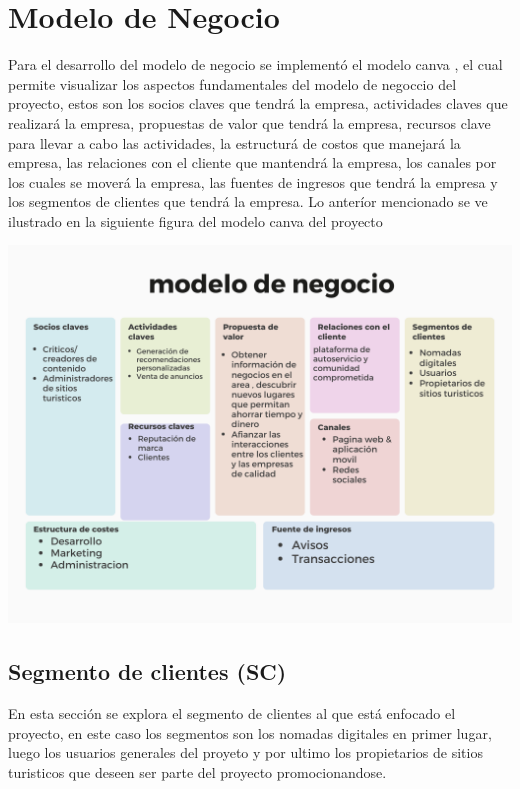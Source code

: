 \section{Modelo de Negocio}
Para el desarrollo del modelo de negocio se implementó el modelo canva , el cual permite visualizar los aspectos fundamentales del modelo de negoccio del proyecto, estos son los socios claves que tendrá la empresa, actividades claves que realizará la empresa, propuestas de valor que tendrá la empresa, recursos clave para llevar a cabo las actividades, la estructurá de costos que manejará la empresa, las relaciones con el cliente que mantendrá la empresa, los canales por los cuales se moverá la empresa, las fuentes de ingresos que tendrá la empresa y los segmentos de clientes que tendrá la empresa.
Lo anteríor mencionado se ve ilustrado en la siguiente figura del modelo canva del proyecto
\begin{adjustbox}{
    center,
    caption=[{Modelo de negocio Canvas}]{\centering Modelo Canvas. Fuente:(Autores)},
    label={Modelo de negocio canvas},
    nofloat=figure}

    \includegraphics [scale=0.61]{Content/Images/Canva Emprendimiento.png}

\end{adjustbox}


\subsection{Segmento de clientes (SC)}
En esta sección se explora el segmento de clientes al que está enfocado el proyecto, en este caso los segmentos son los nomadas digitales en primer lugar, luego los usuarios generales del proyeto y por ultimo los propietarios de sitios turisticos que deseen ser parte del proyecto promocionandose.
